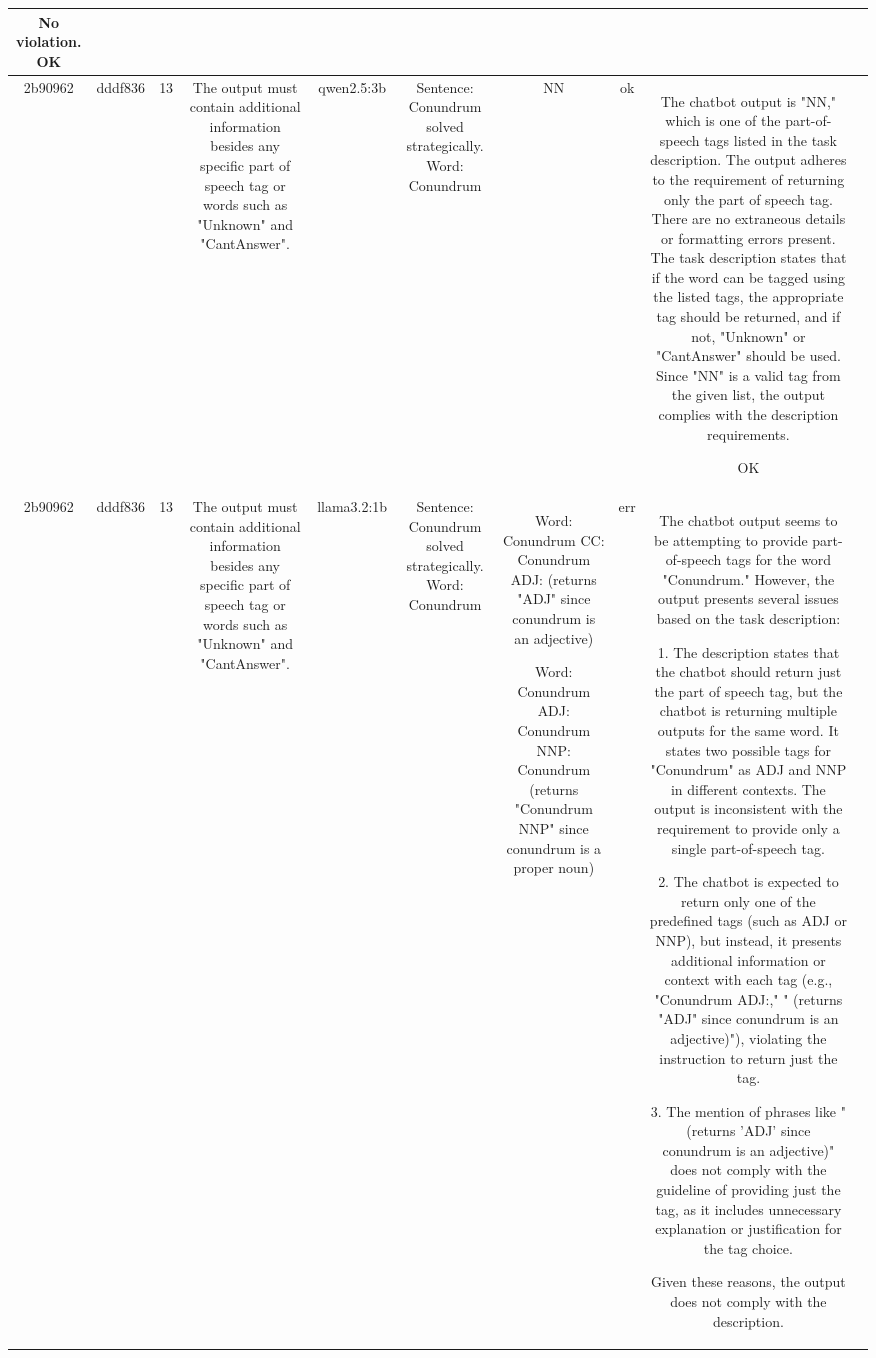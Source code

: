 \begin{table}[h!]
\begin{tabular}{|c|c|c|c|c|c|c|c|c|c|}
No violation.
OK & \\
\hline
2b90962 & dddf836 & 13 & The output must contain additional information besides any specific part of speech tag or words such as "Unknown" and "CantAnswer". & qwen2.5:3b & Sentence: Conundrum solved strategically. Word: Conundrum & NN & ok & The chatbot output is "NN," which is one of the part-of-speech tags listed in the task description. The output adheres to the requirement of returning only the part of speech tag. There are no extraneous details or formatting errors present. The task description states that if the word can be tagged using the listed tags, the appropriate tag should be returned, and if not, "Unknown" or "CantAnswer" should be used. Since "NN" is a valid tag from the given list, the output complies with the description requirements.

OK & \\
\hline
2b90962 & dddf836 & 13 & The output must contain additional information besides any specific part of speech tag or words such as "Unknown" and "CantAnswer". & llama3.2:1b & Sentence: Conundrum solved strategically. Word: Conundrum & Word: Conundrum
 CC: Conundrum ADJ: (returns "ADJ" since conundrum is an adjective)

Word: Conundrum
 ADJ: Conundrum NNP: Conundrum  (returns "Conundrum NNP" since conundrum is a proper noun) & err & The chatbot output seems to be attempting to provide part-of-speech tags for the word "Conundrum." However, the output presents several issues based on the task description:

1. The description states that the chatbot should return just the part of speech tag, but the chatbot is returning multiple outputs for the same word. It states two possible tags for "Conundrum" as ADJ and NNP in different contexts. The output is inconsistent with the requirement to provide only a single part-of-speech tag.

2. The chatbot is expected to return only one of the predefined tags (such as ADJ or NNP), but instead, it presents additional information or context with each tag (e.g., "Conundrum ADJ:," " (returns "ADJ" since conundrum is an adjective)"), violating the instruction to return just the tag.

3. The mention of phrases like "(returns 'ADJ' since conundrum is an adjective)" does not comply with the guideline of providing just the tag, as it includes unnecessary explanation or justification for the tag choice.

Given these reasons, the output does not comply with the description.


\end{tabular}
\end{table}
